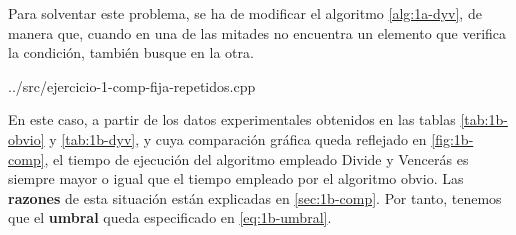 Para solventar este problema, se ha de modificar el algoritmo \ref{alg:1a-dyv}, de manera que, cuando en una de las mitades
no encuentra un elemento que verifica la condición, también busque en la otra.






{../src/ejercicio-1-comp-fija-repetidos.cpp} 


En este caso, a partir de los datos experimentales obtenidos en las tablas \ref{tab:1b-obvio} y \ref{tab:1b-dyv}, y cuya comparación
gráfica queda reflejado en \ref{fig:1b-comp}, el tiempo de ejecución del algoritmo empleado Divide y Vencerás
es siempre mayor o igual que el tiempo empleado por el algoritmo obvio. Las \textbf{razones} de esta situación están
explicadas en \ref{sec:1b-comp}. Por tanto, tenemos que el \textbf{umbral} queda especificado en \ref{eq:1b-umbral}. 

